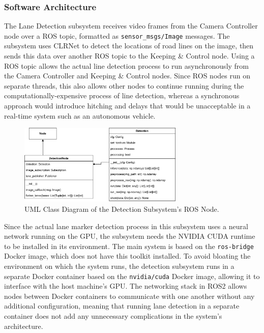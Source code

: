 \documentclass[titlepage, draft]{article}
\begin{document}
{\subsubsection{Software Architecture}

The Lane Detection subsystem receives video frames from the Camera Controller node over a ROS topic, formatted as
\texttt{sensor\_msgs/Image} messages.
The subsystem uses CLRNet to detect the locations of road lines on the image, then sends this data over another ROS topic to the
Keeping \& Control node.
Using a ROS topic allows the actual line detection process to run asynchronously from the Camera Controller and Keeping \& Control nodes.
Since ROS nodes run on separate threads, this also allows other nodes to continue running during the computationally-expensive process
of line detection, whereas a synchronous approach would introduce hitching and delays that would be unacceptable in a real-time system
such as an autonomous vehicle.

\begin{figure}
	\centering
	\includegraphics[width=0.7\textwidth]{Detection-UML}
	\caption{UML Class Diagram of the Detection Subsystem's ROS Node.}
	\label{Detection-UML}
\end{figure}

Since the actual lane marker detection process in this subsystem uses a neural network running on the GPU, the subsystem needs the
NVIDIA CUDA runtime to be installed in its environment.
The main system is based on the \texttt{ros-bridge} \cite{ROSBridge} Docker image, which does not have this toolkit installed.
To avoid bloating the environment on which the system runs, the detection subsystem runs in a separate Docker container based on the
\texttt{nvidia/cuda} Docker image, allowing it to interface with the host machine's GPU.
The networking stack in ROS2 allows nodes between Docker containers to communicate with one another without any additional configuration,
meaning that running lane detection in a separate container does not add any unnecessary complications in the system's architecture.

}
\end{document}

